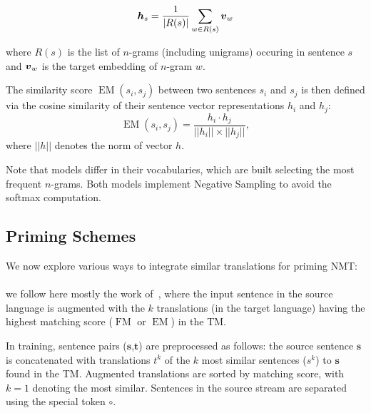 \begin{equation*}
    \boldsymbol{h}_s = \frac{1}{|R(s)|} \sum_{w\in R(s)} \boldsymbol{v}_w
\end{equation*}

\noindent where $R(s)$ is the list of $n$-grams (including unigrams) occuring in sentence $s$ and $\boldsymbol{v}_w$ is the target embedding of $n$-gram $w$.

The similarity score $\operatorname{EM} (s_i,s_j)$ between two sentences $s_i$ and $s_j$ is then defined via the cosine similarity of their sentence vector representations $h_i$ and $h_j$:
\begin{equation*}
\operatorname{EM} (s_i, s_j) = \frac{h_i \cdot h_j}{||h_i|| \times ||h_j||},
\label{eq:EM-chap8}
\end{equation*}
\noindent where $||h||$ denotes the norm of vector $h$.

Note that models differ in their vocabularies, which are built selecting the most frequent $n$-grams.
Both models implement Negative Sampling to avoid the softmax computation. %

\subsection{Priming Schemes}
\label{ssec:schemes-chap8}

We now explore various ways to integrate similar translations for priming NMT:

\paragraph{} we follow here mostly the work of~\citet{bulte19neural},
where the input sentence in the source language is augmented with the $k$ translations (in the target language) having the highest matching score ($\operatorname{FM}$ or $\operatorname{EM}$) in the TM. 

In training, sentence pairs ($\textbf{s}$,$\textbf{t}$) are preprocessed as follows: the source sentence $\textbf{s}$ is concatenated with translations $t^k$ of the $k$ most similar sentences ($s^k$) to $\textbf{s}$ found in the TM. Augmented translations are sorted by matching score, with $k=1$ denoting the most similar. Sentences in the source stream are separated using the special token $\circ$.

